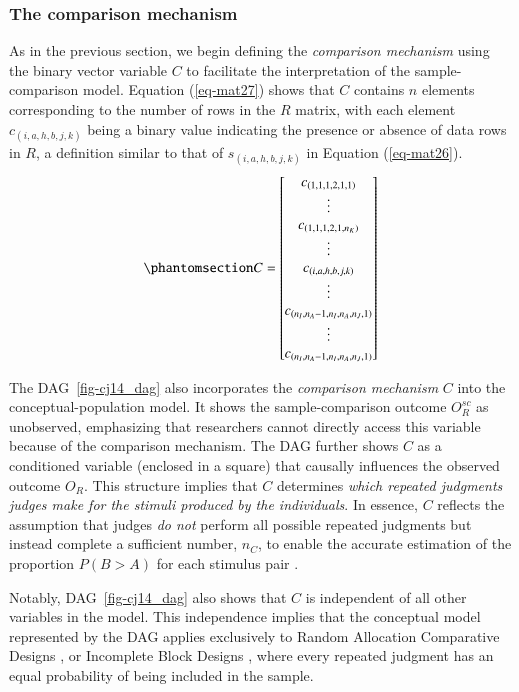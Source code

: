 \documentclass[
  authoryear,
  review,
  1p]{elsarticle}
\begin{document}
\subsubsection{The comparison
mechanism}\label{sec-theory-theoretical_SC2}

As in the previous section, we begin defining the \emph{comparison
mechanism} using the binary vector variable \(C\) to facilitate the
interpretation of the sample-comparison model. Equation (\ref{eq-mat27})
shows that \(C\) contains \(n\) elements corresponding to the number of
rows in the \(R\) matrix, with each element \(c_{(i,a,h,b,j,k)}\) being
a binary value indicating the presence or absence of data rows in \(R\),
a definition similar to that of \(s_{(i,a,h,b,j,k)}\) in Equation
(\ref{eq-mat26}). \begin{equation}\phantomsection\label{eq-mat27}{
C = \begin{bmatrix}
c_{(1,1,1,2,1,1)} \\
\vdots \\
c_{(1,1,1,2,1,n_{K})} \\
\vdots \\
c_{(i,a,h,b,j,k)} \\
\vdots \\
c_{(n_{I},n_{A}-1,n_{I},n_{A},n_{J},1)} \\
\vdots \\
c_{(n_{I},n_{A}-1,n_{I},n_{A},n_{J},1)}
\end{bmatrix}
}\end{equation}

The DAG~\ref{fig-cj14_dag} also incorporates the \emph{comparison
mechanism} \(C\) into the conceptual-population model. It shows the
sample-comparison outcome \(O^{sc}_{R}\) as unobserved, emphasizing that
researchers cannot directly access this variable because of the
comparison mechanism. The DAG further shows \(C\) as a conditioned
variable (enclosed in a square) that causally influences the observed
outcome \(O_{R}\). This structure implies that \(C\) determines
\emph{which repeated judgments judges make for the stimuli produced by
the individuals}. In essence, \(C\) reflects the assumption that judges
\emph{do not} perform all possible repeated judgments but instead
complete a sufficient number, \(n_{C}\), to enable the accurate
estimation of the proportion \(P(B>A)\) for each stimulus pair
\citep[pp.~267]{Thurstone_1927b}.

Notably, DAG~\ref{fig-cj14_dag} also shows that \(C\) is independent of
all other variables in the model. This independence implies that the
conceptual model represented by the DAG applies exclusively to Random
Allocation Comparative Designs \citep{Bramley_2015}, or Incomplete Block
Designs \citep{Lawson_2015}, where every repeated judgment has an equal
probability of being included in the sample.
\end{document}
